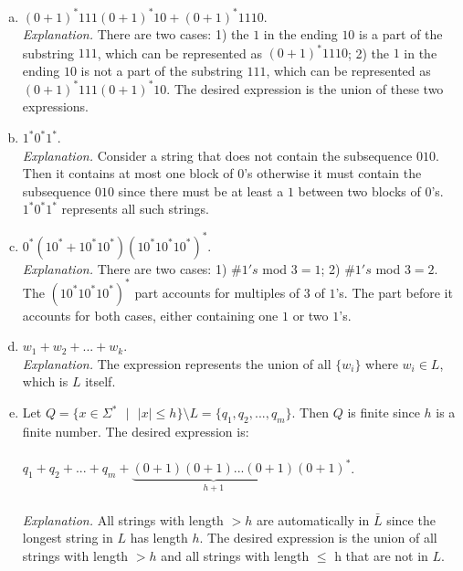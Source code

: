 \documentclass[11pt]{article}
\begin{document}



\begin{solution} 
\begin{enumerate}[(a)]

\item $(0+1)^{*}111(0+1)^{*}10 + (0+1)^{*}1110$. \\
	\emph{Explanation.} There are two cases: 1) the $1$ in the ending $10$ is a part of the substring $111$, which can be represented as $(0+1)^{*}1110$; 2) the $1$ in the ending $10$ is not a part of the substring $111$, which can be represented as $(0+1)^{*}111(0+1)^{*}10$. The desired expression is the union of these two expressions. 
\item $1^{*}0^{*}1^{*}$. \\
	\emph{Explanation.} Consider a string that does not contain the subsequence $010$. Then it contains at most one block of $0$'s otherwise it must contain the subsequence $010$ since there must be at least a $1$ between two blocks of $0$'s. $1^{*}0^{*}1^{*}$ represents all such strings.
\item $0^{*}(10^{*}+10^{*}10^{*})(10^{*}10^{*}10^{*})^{*}$.\\
	\emph{Explanation.} There are two cases: 1) $\#1's$ mod $3 = 1$; 2) $\#1's$ mod $3 = 2$. The $(10^{*}10^{*}10^{*})^{*}$ part accounts for multiples of $3$ of $1$'s. The part before it accounts for both cases, either containing one $1$ or two $1$'s.
\item $w_{1}+w_{2}+...+w_{k}$.\\
	\emph{Explanation.} The expression represents the union of all $\{ w_{i} \}$ where $w_{i}\in L$, which is $L$ itself.
\item Let $Q=\{ x\in \Sigma^{*} \text{ }| \text{ } \lvert x \rvert \leq h  \} \setminus L=\{q_{1},q_{2},...,q_{m}\}$. Then $Q$ is finite since $h$ is a finite number. The desired expression is:\\\\
	$q_{1}+q_{2}+...+q_{m}+\underbrace{(0+1)(0+1)...(0+1)}_{h+1}(0+1)^{*}$.\\\\
	\emph{Explanation.} All strings with length $>h$ are automatically in $\bar{L}$ since the longest string in $L$ has length $h$. The desired expression is the union of all strings with length $>h$ and all strings with length $\leq$ h that are not in $L$.

\end{enumerate}
\end{solution}
\end{document}

